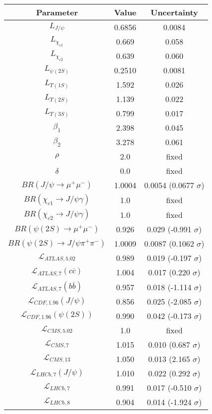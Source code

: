 \begin{table}[h!]
\centering
\begin{tabular}{c|c|c}
Parameter & Value & Uncertainty \\
\hline
$L_{J/\psi}$ & 0.6856 & 0.0084 \\
$L_{\chi_{c1}}$ & 0.669 & 0.058 \\
$L_{\chi_{c2}}$ & 0.639 & 0.060 \\
$L_{\psi(2S)}$ & 0.2510 & 0.0081 \\
$L_{\Upsilon(1S)}$ & 1.592 & 0.026 \\
$L_{\Upsilon(2S)}$ & 1.139 & 0.022 \\
$L_{\Upsilon(3S)}$ & 0.799 & 0.017 \\
$\beta_1$ & 2.398 & 0.045 \\
$\beta_2$ & 3.278 & 0.061 \\
$\rho$ & 2.0 & fixed \\
$\delta$ & 0.0 & fixed \\
$BR(J/\psi\rightarrow\mu^+\mu^-)$ & 1.0004 & 0.0054 (0.0677 $\sigma$) \\
$BR(\chi_{c1}\rightarrow J/\psi\gamma)$ & 1.0 & fixed \\
$BR(\chi_{c2}\rightarrow J/\psi\gamma)$ & 1.0 & fixed \\
$BR(\psi(2S)\rightarrow\mu^+\mu^-)$ & 0.926 & 0.029 (-0.991 $\sigma$) \\
$BR(\psi(2S)\rightarrow J/\psi\pi^+\pi^-)$ & 1.0009 & 0.0087 (0.1062 $\sigma$) \\
$\mathcal L_{ATLAS,5.02}$ & 0.989 & 0.019 (-0.197 $\sigma$) \\
$\mathcal L_{ATLAS,7}(c\overline c)$ & 1.004 & 0.017 (0.220 $\sigma$) \\
$\mathcal L_{ATLAS,7}(b\overline b)$ & 0.957 & 0.018 (-1.114 $\sigma$) \\
$\mathcal L_{CDF,1.96}(J/\psi)$ & 0.856 & 0.025 (-2.085 $\sigma$) \\
$\mathcal L_{CDF,1.96}(\psi(2S))$ & 0.990 & 0.042 (-0.173 $\sigma$) \\
$\mathcal L_{CMS,5.02}$ & 1.0 & fixed \\
$\mathcal L_{CMS,7}$ & 1.015 & 0.010 (0.687 $\sigma$) \\
$\mathcal L_{CMS,13}$ & 1.050 & 0.013 (2.165 $\sigma$) \\
$\mathcal L_{LHCb,7}(J/\psi)$ & 1.010 & 0.022 (0.292 $\sigma$) \\
$\mathcal L_{LHCb,7}$ & 0.991 & 0.017 (-0.510 $\sigma$) \\
$\mathcal L_{LHCb,8}$ & 0.904 & 0.014 (-1.924 $\sigma$) \\

\end{tabular}
\end{table}
